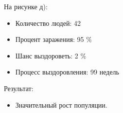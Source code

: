 \documentclass[14pt,a4paper,report]{report}
\begin{document}
\begin{figure}[h]
\begin{minipage}[h]{0.49\linewidth}
\end{minipage}
\hfill
\begin{minipage}[h]{0.49\linewidth}
\end{minipage}
\label{ris:image1}
\end{figure}

На рисунке д):
\begin{itemize}
\item Количество людей: 42
\item Процент заражения: 95 \%
\item Шанс выздороветь: 2 \%
\item Процесс выздоровления: 99 недель
\end{itemize}
Результат:
\begin{itemize}
\item Значительный рост популяции.
\end{itemize}
\end{document}
